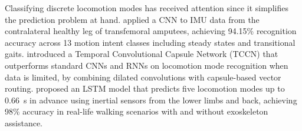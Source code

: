 Classifying discrete locomotion modes has received attention since it simplifies the prediction problem at hand. \citet{suCNNBasedMethodIntent2019} applied a CNN to IMU data from the contralateral healthy leg of transfemoral amputees, achieving 94.15\% recognition accuracy across 13 motion intent classes including steady states and transitional gaits. \citet{fengSmallDataDrivenTemporalConvolutional2022} introduced a Temporal Convolutional Capsule Network (TCCN) that outperforms standard CNNs and RNNs on locomotion mode recognition when data is limited, by combining dilated convolutions with capsule-based vector routing. \citet{carvalhoLocomotionModePrediction2025} proposed an LSTM model that predicts five locomotion modes up to 0.66~s in advance using inertial sensors from the lower limbs and back, achieving 98\% accuracy in real-life walking scenarios with and without exoskeleton assistance.
 

